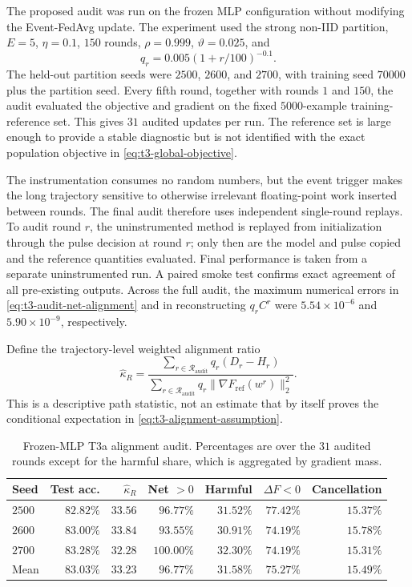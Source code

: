The proposed audit was run on the frozen MLP configuration without modifying
the Event-FedAvg update.  The experiment used the strong non-IID partition,
$E=5$, $\eta=0.1$, $150$ rounds, $\rho=0.999$, $\vartheta=0.025$, and
\begin{equation}
    q_r=0.005(1+r/100)^{-0.1}.
\end{equation}
The held-out partition seeds were $2500$, $2600$, and $2700$, with training
seed $70000$ plus the partition seed.  Every fifth round, together with rounds
$1$ and $150$, the audit evaluated the objective and gradient on the fixed
$5000$-example training-reference set.  This gives $31$ audited updates per
run.  The reference set is large enough to provide a stable diagnostic but is
not identified with the exact population objective in
\eqref{eq:t3-global-objective}.

The instrumentation consumes no random numbers, but the event trigger makes
the long trajectory sensitive to otherwise irrelevant floating-point work
inserted between rounds.  The final audit therefore uses independent
single-round replays.  To audit round $r$, the uninstrumented method is replayed
from initialization through the pulse decision at round $r$; only then are the
model and pulse copied and the reference quantities evaluated.  Final
performance is taken from a separate uninstrumented run.  A paired smoke test
confirms exact agreement of all pre-existing outputs.  Across the full audit,
the maximum numerical errors in \eqref{eq:t3-audit-net-alignment} and in
reconstructing $q_rC^r$ were $5.54\times10^{-6}$ and
$5.90\times10^{-9}$, respectively.

Define the trajectory-level weighted alignment ratio
\begin{equation}
    \widehat\kappa_R
    =
    \frac{\sum_{r\in\mathcal{R}_{\mathrm{audit}}}
      q_r(D_r-H_r)}
    {\sum_{r\in\mathcal{R}_{\mathrm{audit}}}
      q_r\|\nabla F_{\mathrm{ref}}(w^r)\|_2^2}.
    \label{eq:t3-empirical-kappa}
\end{equation}
This is a descriptive path statistic, not an estimate that by itself proves
the conditional expectation in \eqref{eq:t3-alignment-assumption}.

\begin{table}[H]
\centering
\caption{Frozen-MLP T3a alignment audit.  Percentages are over the $31$
audited rounds except for the harmful share, which is aggregated by gradient
mass.}
\label{tab:t3a-alignment-summary}
\small
\begin{tabular}{lrrrrrr}
\toprule
Seed & Test acc. & $\widehat\kappa_R$ & Net $>0$ & Harmful & $\Delta F<0$ & Cancellation\\
\midrule
$2500$ & $82.82\%$ & $33.56$ & $96.77\%$ & $31.52\%$ & $77.42\%$ & $15.37\%$\\
$2600$ & $83.00\%$ & $33.84$ & $93.55\%$ & $30.91\%$ & $74.19\%$ & $15.78\%$\\
$2700$ & $83.28\%$ & $32.28$ & $100.00\%$ & $32.30\%$ & $74.19\%$ & $15.31\%$\\
\midrule
Mean & $83.03\%$ & $33.23$ & $96.77\%$ & $31.58\%$ & $75.27\%$ & $15.49\%$\\
\bottomrule
\end{tabular}
\end{table}

